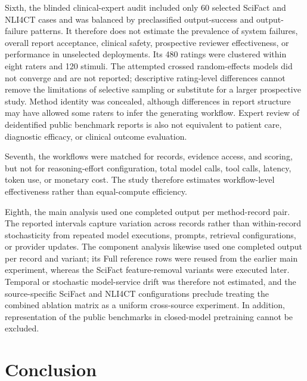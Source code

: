 \documentclass[11pt,a4paper]{article}
\begin{document}
Sixth, the blinded clinical-expert audit included only 60 selected SciFact and NLI4CT cases and was balanced by preclassified output-success and output-failure patterns. It therefore does not estimate the prevalence of system failures, overall report acceptance, clinical safety, prospective reviewer effectiveness, or performance in unselected deployments. Its 480 ratings were clustered within eight raters and 120 stimuli. The attempted crossed random-effects models did not converge and are not reported; descriptive rating-level differences cannot remove the limitations of selective sampling or substitute for a larger prospective study. Method identity was concealed, although differences in report structure may have allowed some raters to infer the generating workflow. Expert review of deidentified public benchmark reports is also not equivalent to patient care, diagnostic efficacy, or clinical outcome evaluation.

Seventh, the workflows were matched for records, evidence access, and scoring, but not for reasoning-effort configuration, total model calls, tool calls, latency, token use, or monetary cost. The study therefore estimates workflow-level effectiveness rather than equal-compute efficiency.

Eighth, the main analysis used one completed output per method-record pair. The reported intervals capture variation across records rather than within-record stochasticity from repeated model executions, prompts, retrieval configurations, or provider updates. The component analysis likewise used one completed output per record and variant; its Full reference rows were reused from the earlier main experiment, whereas the SciFact feature-removal variants were executed later. Temporal or stochastic model-service drift was therefore not estimated, and the source-specific SciFact and NLI4CT configurations preclude treating the combined ablation matrix as a uniform cross-source experiment. In addition, representation of the public benchmarks in closed-model pretraining cannot be excluded.

\section{Conclusion}
\end{document}
